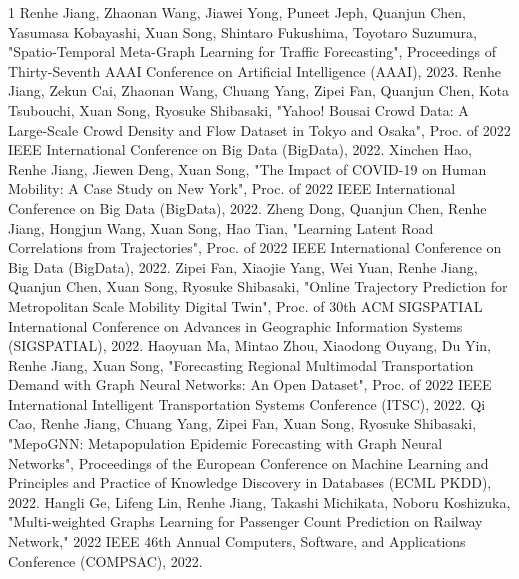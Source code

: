 \begin{査読付}{1}
Renhe Jiang, Zhaonan Wang, Jiawei Yong, Puneet Jeph, Quanjun Chen, Yasumasa Kobayashi,
Xuan Song, Shintaro Fukushima, Toyotaro Suzumura, "Spatio-Temporal Meta-Graph Learning for Traffic Forecasting", Proceedings of Thirty-Seventh AAAI Conference on Artificial Intelligence (AAAI), 2023.
Renhe Jiang, Zekun Cai, Zhaonan Wang, Chuang Yang, Zipei Fan, Quanjun Chen, Kota Tsubouchi, Xuan Song, Ryosuke Shibasaki, "Yahoo! Bousai Crowd Data: A Large-Scale Crowd Density and Flow Dataset in Tokyo and Osaka", Proc. of 2022 IEEE International Conference on Big Data (BigData), 2022.
Xinchen Hao, Renhe Jiang, Jiewen Deng, Xuan Song, "The Impact of COVID-19 on Human Mobility: A Case Study on New York", Proc. of 2022 IEEE International Conference on Big Data (BigData), 2022.
Zheng Dong, Quanjun Chen, Renhe Jiang, Hongjun Wang, Xuan Song, Hao Tian, "Learning Latent Road Correlations from Trajectories", Proc. of 2022 IEEE International Conference on Big Data (BigData), 2022.
Zipei Fan, Xiaojie Yang, Wei Yuan, Renhe Jiang, Quanjun Chen, Xuan Song, Ryosuke Shibasaki, "Online Trajectory Prediction for Metropolitan Scale Mobility Digital Twin", Proc. of 30th ACM SIGSPATIAL International Conference on Advances in Geographic Information Systems (SIGSPATIAL), 2022. 
Haoyuan Ma, Mintao Zhou, Xiaodong Ouyang, Du Yin, Renhe Jiang, Xuan Song, "Forecasting Regional Multimodal Transportation Demand with Graph Neural Networks: An Open Dataset", Proc. of 2022 IEEE International Intelligent Transportation Systems Conference (ITSC), 2022.
Qi Cao, Renhe Jiang, Chuang Yang, Zipei Fan, Xuan Song, Ryosuke Shibasaki, "MepoGNN: Metapopulation Epidemic Forecasting with Graph Neural Networks", Proceedings of the European Conference on Machine Learning and Principles and Practice of Knowledge Discovery in Databases (ECML PKDD), 2022. 
Hangli Ge, Lifeng Lin, Renhe Jiang, Takashi Michikata, Noboru Koshizuka, "Multi-weighted Graphs Learning for Passenger Count Prediction on Railway Network," 2022 IEEE 46th Annual Computers, Software, and Applications Conference (COMPSAC), 2022.
\end{査読付}

